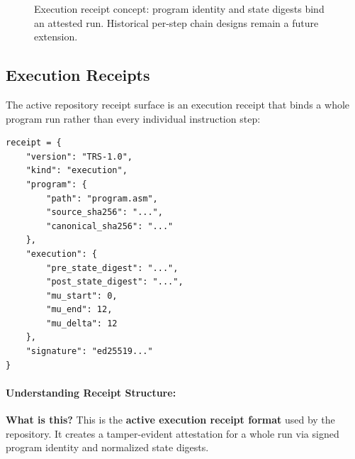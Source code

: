 \begin{figure}[h]
\centering
{}
\caption{Execution receipt concept: program identity and state digests bind an attested run. Historical per-step chain designs remain a future extension.}
\label{fig:receipt-chain}
\end{figure}

\subsection{Execution Receipts}

The active repository receipt surface is an execution receipt that binds a whole program run rather than every individual instruction step:
\begin{lstlisting}
receipt = {
    "version": "TRS-1.0",
    "kind": "execution",
    "program": {
        "path": "program.asm",
        "source_sha256": "...",
        "canonical_sha256": "..."
    },
    "execution": {
        "pre_state_digest": "...",
        "post_state_digest": "...",
        "mu_start": 0,
        "mu_end": 12,
        "mu_delta": 12
    },
    "signature": "ed25519..."
}
\end{lstlisting}

\paragraph{Understanding Receipt Structure:}

\textbf{What is this?} This is the \textbf{active execution receipt format} used by the repository. It creates a tamper-evident attestation for a whole run via signed program identity and normalized state digests.

